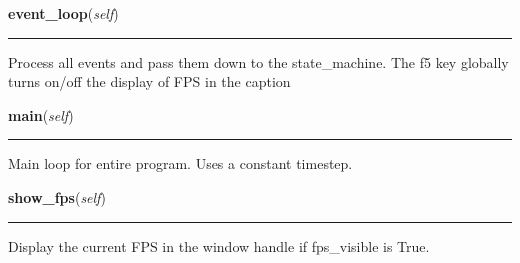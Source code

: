 \hspace{.8\funcindent}\begin{boxedminipage}{\funcwidth}

    \raggedright \textbf{event\_loop}(\textit{self})

    \vspace{-1.5ex}

    \rule{\textwidth}{0.5\fboxrule}
\setlength{\parskip}{2ex}
    Process all events and pass them down to the state\_machine. The f5 key
    globally turns on/off the display of FPS in the caption

\setlength{\parskip}{1ex}
    \end{boxedminipage}

    \label{pygame-asteroids:tools:Control:main}

    \vspace{0.5ex}

\hspace{.8\funcindent}\begin{boxedminipage}{\funcwidth}

    \raggedright \textbf{main}(\textit{self})

    \vspace{-1.5ex}

    \rule{\textwidth}{0.5\fboxrule}
\setlength{\parskip}{2ex}
    Main loop for entire program. Uses a constant timestep.

\setlength{\parskip}{1ex}
    \end{boxedminipage}

    \label{pygame-asteroids:tools:Control:show_fps}

    \vspace{0.5ex}

\hspace{.8\funcindent}\begin{boxedminipage}{\funcwidth}

    \raggedright \textbf{show\_fps}(\textit{self})

    \vspace{-1.5ex}

    \rule{\textwidth}{0.5\fboxrule}
\setlength{\parskip}{2ex}
    Display the current FPS in the window handle if fps\_visible is True.

\setlength{\parskip}{1ex}
    \end{boxedminipage}


